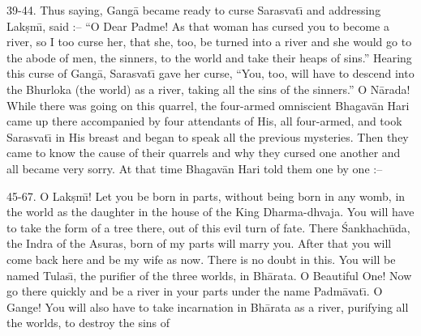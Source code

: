 39-44. Thus saying, Gang\=a became ready to curse Sarasvat\={\i} and addressing Lak\d{s}m\={\i}, said :-- ``O Dear Padme! As that woman has cursed you to become a river, so I too curse her, that she, too, be turned into a river and she would go to the abode of men, the sinners, to the world and take their heaps of sins.'' Hearing this curse of Gang\=a, Sarasvat\={\i} gave her curse, ``You, too, will have to descend into the Bhurloka (the world) as a river, taking all the sins of the sinners.'' O N\=arada! While there was going on this quarrel, the four-armed omniscient Bhagav\=an Hari came up there accompanied by four attendants of His, all four-armed, and took Sarasvat\={\i} in His breast and began to speak all the previous mysteries. Then they came to know the cause of their quarrels and why they cursed one another and all became very sorry. At that time Bhagav\=an Hari told them one by one :--

45-67. O Lak\d{s}m\={\i}! Let you be born in parts, without being born in any womb, in the world as the daughter in the house of the King Dharma-dhvaja. You will have to take the form of a tree there, out of this evil turn of fate. There \'Sankhach\=uda, the Indra of the Asuras, born of my parts will marry you. After that you will come back here and be my wife as now. There is no doubt in this. You will be named Tulas\={\i}, the purifier of the three worlds, in Bh\=arata. O Beautiful One! Now go there quickly and be a river in your parts under the name Padm\=avat\={\i}. O Gange! You will also have to take incarnation in Bh\=arata as a river, purifying all the worlds, to destroy the sins of

